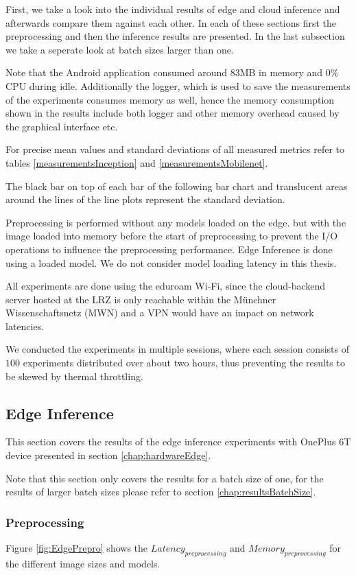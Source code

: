 First, we take a look into the individual results of edge and cloud inference and afterwards compare them against each other. In each of these sections first the preprocessing and then the inference results are presented. 
In the last subsection we take a seperate look at batch sizes larger than one.

Note that the Android application consumed around 83MB in memory and 0\% CPU during idle. Additionally the logger, which is used to save the measurements of the experiments consumes memory as well, hence the memory consumption shown in the results include both logger and other memory overhead caused by the graphical interface etc.

For precise mean values and standard deviations of all measured metrics refer to tables \ref{measurementsInception} and \ref{measurementsMobilenet}.

The black bar on top of each bar of the following bar chart and translucent areas around the lines of the line plots represent the standard deviation.

Preprocessing is performed without any models loaded on the edge. but with the image loaded into memory before the start of preprocessing to prevent the I/O operations to influence the preprocessing performance.
Edge Inference is done using a loaded model. We do not consider model loading latency in this thesis.

All experiments are done using the eduroam Wi‑Fi, since the cloud-backend server hosted at the LRZ is only reachable within the Münchner Wissenschaftsnetz (MWN) and a VPN would have an impact on network latencies.

We conducted the experiments in multiple sessions, where each session consists of $100$ experiments distributed over about two hours, thus preventing the results to be skewed by thermal throttling.
\subsection{Edge Inference}
This section covers the results of the edge inference experiments with OnePlus 6T device presented in section \ref{chap:hardwareEdge}.

Note that this section only covers the results for a batch size of one, for the results of larger batch sizes please refer to section \ref{chap:resultsBatchSize}.

\FloatBarrier
\subsubsection{Preprocessing}
\label{chap:edgePrepro}
Figure \ref{fig:EdgePrepro} shows the $Latency_{preprocessing}$ and $Memory_{preprocessing}$ for the different image sizes and models.

